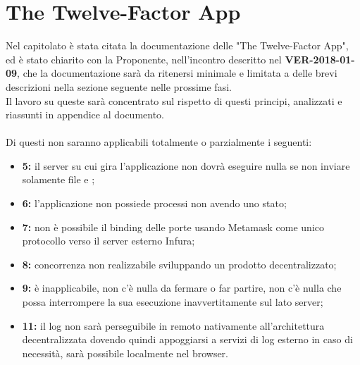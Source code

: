 \documentclass[PianoDiQualifica.tex]{subfiles}
\begin{document}
\section{The Twelve-Factor App}
Nel capitolato è stata citata la documentazione delle "The Twelve-Factor App", ed è stato chiarito con la Proponente, nell'incontro descritto nel \textbf{VER-2018-01-09}, che la documentazione sarà da ritenersi minimale e limitata a delle brevi descrizioni nella sezione seguente nelle prossime fasi.\\
Il lavoro su queste sarà concentrato sul rispetto di questi principi, analizzati e riassunti in appendice al documento.\\\\
Di questi non saranno applicabili totalmente o parzialmente i seguenti:
\begin{itemize}
	\item \textbf{5:} il server su cui gira l'applicazione non dovrà eseguire nulla se non inviare solamente file  e ;
	\item \textbf{6:} l'applicazione non possiede processi non avendo uno stato;
	\item \textbf{7:} non è possibile il binding delle porte usando Metamask come unico protocollo verso il server esterno Infura;
	\item \textbf{8:} concorrenza non realizzabile sviluppando un prodotto decentralizzato;
	\item \textbf{9:} è inapplicabile, non c'è nulla da fermare o far partire, non c'è nulla che possa interrompere la sua esecuzione inavvertitamente sul lato server;
	\item \textbf{11:} il log non sarà perseguibile in remoto nativamente all'architettura decentralizzata dovendo quindi appoggiarsi a servizi di log esterno in caso di necessità, sarà possibile localmente nel browser.
\end{itemize}
\end{document}
